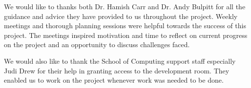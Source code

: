 We would like to thanks both Dr. Hamish Carr and Dr. Andy Bulpitt for all the guidance and advice they have provided to us throughout the project. Weekly meetings and thorough planning sessions were helpful towards the success of this project. The meetings inspired motivation and time to reflect on current progress on the project and an opportunity to discuss challenges faced.
\newline
\par
We would also like to thank the School of Computing support staff especially Judi Drew for their help in granting access to the development room. They enabled us to work on the project whenever work was needed to be done.